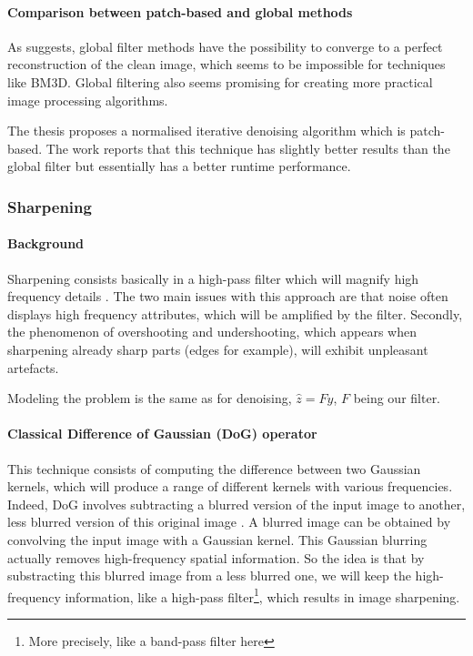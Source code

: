 \paragraph{Comparison between patch-based and global methods}
As \cite{talebi_asymptotic_2016} suggests, global filter methods have the possibility to converge to a perfect reconstruction of the clean image, which seems to be impossible for techniques like BM3D.
Global filtering also seems promising for creating more practical image processing algorithms.

The thesis \cite{kheradmand_graph-based_2016} proposes a normalised iterative denoising algorithm which is patch-based.
The work reports that this technique has slightly better results than the global filter but essentially has a better runtime performance.

\subsubsection{Sharpening}

\paragraph{Background}
Sharpening consists basically in a high-pass filter which will magnify high frequency details \cite{kheradmand_graph-based_2016}.
The two main issues with this approach are that noise often displays high frequency attributes, which will be amplified by the filter.
Secondly, the phenomenon of overshooting and undershooting, which appears when sharpening already sharp parts (edges for example), will exhibit unpleasant artefacts.

Modeling the problem is the same as for denoising, \(\hat{z} = Fy\), \(F\) being our filter.

\paragraph{Classical Difference of Gaussian (DoG) operator}
This technique consists of computing the difference between two Gaussian kernels, which will produce a range of different kernels with various frequencies.
Indeed, DoG involves subtracting a blurred version of the input image to another, less blurred version of this original image \cite{wiki:Difference_of_Gaussians}.
A blurred image can be obtained by convolving the input image with a Gaussian kernel.
This Gaussian blurring actually removes high-frequency spatial information.
So the idea is that by substracting this blurred image from a less blurred one, we will keep the high-frequency information, like a high-pass filter\footnote{More precisely, like a band-pass filter here}, which results in image sharpening.

